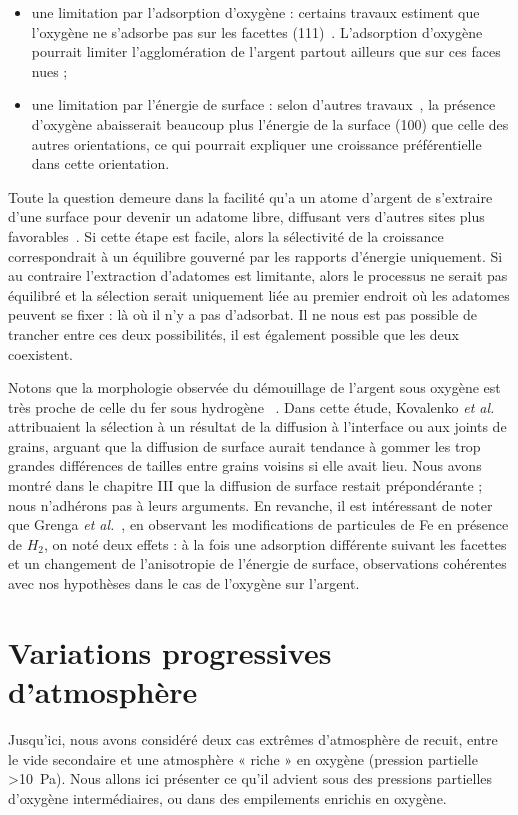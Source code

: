 {{\begin{itemize}
\item une limitation par l’adsorption d’oxygène : certains travaux estiment que l’oxygène ne s’adsorbe pas sur les facettes (111)~\cite{engelhardt1976adsorption}. L’adsorption d’oxygène pourrait limiter l’agglomération de l’argent partout ailleurs que sur ces faces \og nues \fg ;
\item une limitation par l’énergie de surface : selon d’autres travaux~\cite{molina2011size}, la présence d'oxygène abaisserait beaucoup plus l'énergie de la surface (100) que celle des autres orientations, ce qui pourrait expliquer une croissance préférentielle dans cette orientation.
\end{itemize}
Toute la question demeure dans la facilité qu’a un atome d’argent de s’extraire d’une surface pour devenir un adatome libre, diffusant vers d’autres sites plus favorables~\cite{combe00}. Si cette étape est facile, alors la sélectivité de la croissance correspondrait à un équilibre gouverné par les rapports d’énergie uniquement. Si au contraire l’extraction d’adatomes est limitante, alors le processus ne serait pas équilibré et la sélection serait uniquement liée au premier endroit où les adatomes peuvent se fixer : là où il n’y a pas d’adsorbat. Il ne nous est pas possible de trancher entre ces deux possibilités, il est également possible que les deux coexistent.\par
Notons que la morphologie observée du démouillage de l’argent sous oxygène est très proche de celle du fer sous hydrogène~\cite{kovalenko2013solid} . Dans cette étude, Kovalenko \textit{et al.} attribuaient la sélection à un résultat de la diffusion à l’interface ou aux joints de grains, arguant que la diffusion de surface aurait tendance à gommer les trop grandes différences de tailles entre grains voisins si elle avait lieu. Nous avons montré dans le chapitre III que la diffusion de surface restait prépondérante ; nous n’adhérons pas à leurs arguments. En revanche, il est intéressant de noter que Grenga \textit{et al.}~\cite{grenga1976surface}, en observant les modifications de particules de Fe en présence de $H_2$, on noté deux effets : à la fois une adsorption différente suivant les facettes et un changement de l’anisotropie de l’énergie de surface, observations cohérentes avec nos hypothèses dans le cas de l'oxygène sur l'argent.\par 

\section{Variations progressives d'atmosphère}
Jusqu’ici, nous avons considéré deux cas extrêmes d’atmosphère de recuit, entre le vide secondaire et une atmosphère « riche » en oxygène (pression partielle >10~Pa). Nous allons ici présenter ce qu’il advient sous des pressions partielles d’oxygène intermédiaires, ou dans des empilements enrichis en oxygène.\par 
}}
